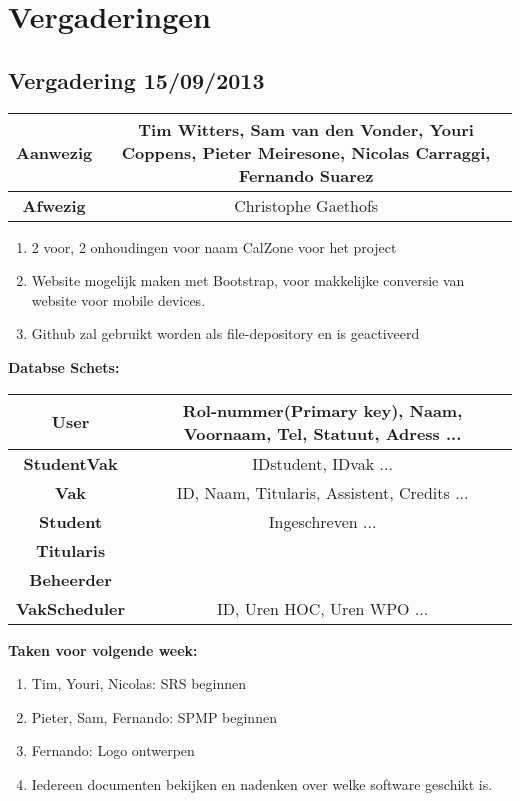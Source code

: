 \chapter{Vergaderingen}
\section{Vergadering 15/09/2013}

\begin{table}[htbp]
	\centering
	\begin{tabular}{c|c}
		\textbf{Aanwezig} & Tim Witters, Sam van den Vonder, Youri Coppens, Pieter Meiresone,  Nicolas Carraggi,  Fernando Suarez \\
		\hline
		\textbf{Afwezig} & Christophe Gaethofs \\
	\end{tabular}
\end{table}

\begin{enumerate}
	\item 2 voor, 2 onhoudingen voor naam CalZone voor het project \\
	\item Website mogelijk maken met Bootstrap, voor makkelijke conversie van website voor mobile devices. \\
	\item Github zal gebruikt worden als file-depository en is geactiveerd \\
\end{enumerate}

\noindent \textbf{Databse Schets:}

\begin{table}[htbp]
	\centering
	\begin{tabular}{c|c}
	\textbf{User} & Rol-nummer(Primary key), Naam, Voornaam, Tel, Statuut, Adress ... \\
	\hline
	\textbf{StudentVak} & IDstudent, IDvak ...\\
	\hline
	\textbf{Vak} & ID, Naam, Titularis, Assistent, Credits ...\\
	\hline
	\textbf{Student} & Ingeschreven ...\\
	\hline
	\textbf{Titularis} & \\
	\hline
	\textbf{Beheerder} & \\
	\hline
	\textbf{VakScheduler} & ID, Uren HOC, Uren WPO ...\\
	\end{tabular}
\end{table}

\noindent \textbf{Taken voor volgende week:}
\begin{enumerate}
	\item Tim, Youri, Nicolas: SRS beginnen
	\item Pieter, Sam, Fernando: SPMP beginnen
	\item Fernando: Logo ontwerpen
	\item Iedereen documenten bekijken en nadenken over welke software geschikt is.
\end{enumerate}